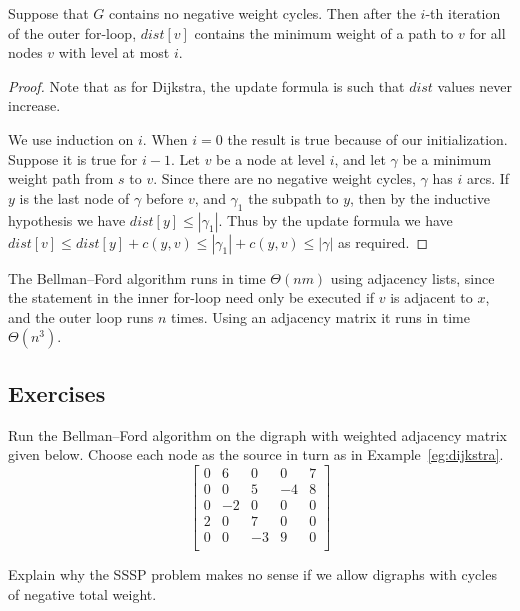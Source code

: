 \begin{Theorem} 
Suppose that $G$ contains no negative weight cycles. Then after the $i$-th 
iteration of the outer for-loop, $dist[v]$ contains the minimum weight of a 
path to $v$ for all nodes $v$ with level at most $i$.
\end{Theorem}

\begin{proof} 
Note that as for Dijkstra, the update formula is such that
$dist$ values never increase.

We use induction on $i$. When $i=0$ the  result is true because of our
initialization. Suppose it is true for $i-1$. Let $v$ be a node at level
$i$, and let $\gamma$ be a minimum weight path from $s$ to $v$. Since
there are no negative weight cycles, $\gamma$ has $i$ arcs. If $y$
is the last node of $\gamma$ before $v$, and $\gamma_1$ the subpath to
$y$, then by the inductive hypothesis we have $dist[y] \leq | \gamma_1
|$. Thus by the update formula we have $dist[v] \leq dist[y] + c(y, v)
\leq | \gamma_1 | + c(y, v) \leq | \gamma |$ as required.
\end{proof}

The Bellman--Ford algorithm runs in time $\Theta(nm)$ using adjacency
lists, since the statement in the inner for-loop need only be
executed if $v$ is adjacent to $x$, and the outer loop runs $n$
times. Using an adjacency matrix it runs in time $\Theta(n^3)$.

\subsection*{Exercises}

\begin{Exercise} 
\label{ex:do-bellford}
Run the Bellman--Ford algorithm on the digraph with weighted adjacency 
matrix given below. Choose each node as the source in turn as in 
Example~\ref{eg:dijkstra}.
$$
\left[
\begin{matrix}
0 & 6 & 0 & 0 & 7 \\
0 & 0 & 5 & -4 & 8 \\
0 & -2 & 0 & 0 & 0 \\
2 & 0 & 7 & 0 & 0 \\
0 & 0 & -3 & 9 & 0 \\
\end{matrix}
\right]
$$
\end{Exercise}

\begin{Exercise}\label{ex:SSSP-neg-cycle}
Explain why the SSSP problem makes no sense if we allow digraphs with
cycles of negative total weight.
\end{Exercise}

